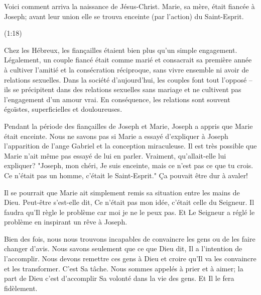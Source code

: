 

\epigraph{%
Voici comment arriva la naissance de Jésus-Christ. Marie, sa mère, était fiancée à Joseph; avant leur union elle se trouva enceinte (par l’action) du Saint-Esprit.}{(1:18)}

Chez les Hébreux, les fiançailles étaient bien plus qu'un simple engagement. Légalement, un couple fiancé était comme marié et consacrait sa première année à cultiver l'amitié et la consécration réciproque, sans vivre ensemble ni avoir de relations sexuelles. Dans la société d'aujourd'hui, les couples font tout l'opposé – ils se précipitent dans des relations sexuelles sans mariage et ne cultivent pas l'engagement d'un amour vrai. En conséquence, les relations sont souvent égoïstes, superficielles et douloureuses.

Pendant la période des fiançailles de Joseph et Marie, Joseph a appris que Marie était enceinte. Nous ne savons pas si Marie a essayé d'expliquer à Joseph l'apparition de l'ange Gabriel et la conception miraculeuse. Il est très possible que Marie n'ait même pas essayé de lui en parler. Vraiment, qu'allait-elle lui expliquer? "Joseph, mon chéri, Je suis enceinte, mais ce n'est pas ce que tu crois. Ce n'était pas un homme, c'était le Saint-Esprit." Ça pouvait être dur à avaler!

Il se pourrait que Marie ait simplement remis sa situation entre les mains de Dieu. Peut-être s'est-elle dit, Ce n'était pas mon idée, c'était celle du Seigneur. Il faudra qu'Il règle le problème car moi je ne le peux pas. Et Le Seigneur a réglé le problème en inspirant un rêve à Joseph.

Bien des fois, nous nous trouvons incapables de convaincre les gens ou de les faire changer d'avis. Nous savons seulement que ce que Dieu dit, Il a l'intention de l'accomplir. Nous devons remettre ces gens à Dieu et croire qu'Il va les convaincre et les transformer. C'est Sa tâche. Nous sommes appelés à prier et à aimer; la part de Dieu c'est d'accomplir Sa volonté dans la vie des gens. Et Il le fera fidèlement.




                      

